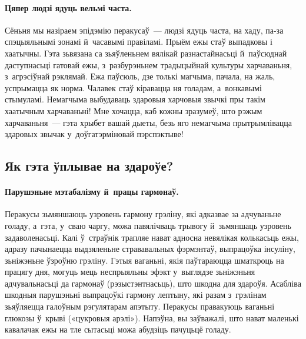 
\paragraph{Цяпер людзі ядуць вельмі часта.}
Сёньня мы назіраем эпідэмію перакусаў~--- людзі ядуць часта, на хаду, па-за спэцыяльнымі зонамі й~часавымі правіламі. Прыём ежы стаў выпадковы і хаатычны. Гэта зьвязана са зьяўленьнем вялікай разнастайнасьці й~паўсюднай даступнасьці гатовай ежы, з~разбурэньнем традыцыйнай культуры харчаваньня, з~агрэсіўнай рэклямай. Ежа паўсюль, дзе толькі магчыма, пачала, на жаль, успрымацца як норма. Чалавек стаў кіравацца ня голадам, а~вонкавымі стымуламі. Немагчыма выбудаваць здаровыя харчовыя звычкі пры такім хаатычным харчаваньні! Мне хочацца, каб кожны зразумеў, што рэжым харчаваньня~--- гэта хрыбет вашай дыеты, безь яго немагчыма прытрымлівацца здаровых звычак у~доўгатэрміновай пэрспэктыве!

\subsection{Як гэта ўплывае на здароўе?}

\paragraph{Парушэньне мэтабалізму й~працы гармонаў.}
Перакусы зьмяншаюць узровень гармону грэліну, які адказвае за адчуваньне голаду, а~гэта, у~сваю чаргу, можа павялічваць трывогу й~зьмяншаць узровень задаволенасьці. Калі ў~страўнік трапляе нават адносна невялікая колькасьць ежы, адразу пачынаецца выдзяленьне стрававальных фэрмэнтаў, выпрацоўка інсуліну, зьніжэньне ўзроўню грэліну. Гэтыя ваганьні, якія паўтараюцца шматкроць на працягу дня, могуць мець неспрыяльны эфэкт у~выглядзе зьніжэньня адчувальнасьці да гармонаў (рэзыстэнтнасьць), што шкодна для здароўя. Асабліва шкодныя парушэньні выпрацоўкі гармону лептыну, які разам з~грэлінам зьяўляецца галоўным рэгулятарам апэтыту. Перакусы правакуюць ваганьні глюкозы ў~крыві («цукровыя арэлі»). Напэўна, вы заўважалі, што нават маленькі кавалачак ежы на тле сытасьці можа абудзіць пачуцьцё голаду.

